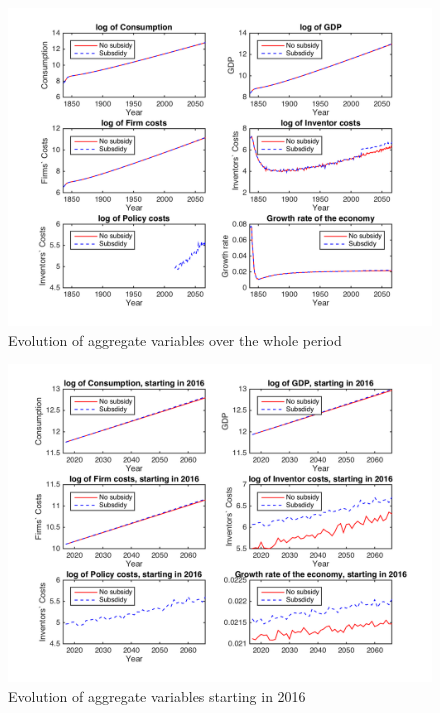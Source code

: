 \documentclass[a4paper,11pt]{article}
\theoremstyle{prop}
\theoremstyle{lemma}
\begin{document}
\begin{figure}
\centering
\includegraphics[scale=.6]{aggregatesNT_50y}
\caption{Evolution of aggregate variables over the whole period}
\end{figure}

\begin{figure}
\centering
\includegraphics[scale=.6]{aggregates2016NT_50y}
\caption{Evolution of aggregate variables starting in 2016}
\end{figure}
\end{document}
